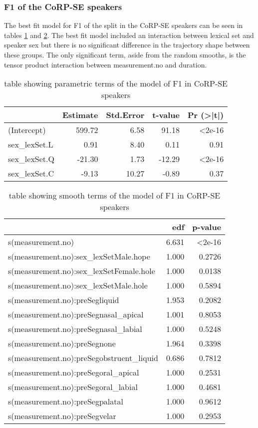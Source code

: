 \documentclass[../../../00.FullDoc/tex/Thesis]{subfiles}
\begin{document}
\subsubsection{F1 of the CoRP-SE speakers}
The best fit model for F1 of the \GG{} split in the CoRP-SE speakers can be seen in tables \ref{tbl:GGF1SE-para} and \ref{tbl:GGF1SE-smooth}. The best fit model included an interaction between lexical set and speaker sex but there is no significant difference in the trajectory shape between these groups. The only significant term, aside from the random smooths, is the tensor product interaction between measurement.no and duration.

\begin{table}[htbp]
	\centering
	\begin{tabular}{lrrrr}
		\hline
		& Estimate & Std.Error & t-value & Pr (>|t|) \\
		\hline
		(Intercept) & 599.72 & 6.58 & 91.18 & <2e-16 \\
		sex\_lexSet.L & 0.91 & 8.40 & 0.11 & 0.91 \\
		sex\_lexSet.Q & -21.30 & 1.73 & -12.29 & <2e-16 \\
		sex\_lexSet.C & -9.13 & 10.27 & -0.89 & 0.37 \\		
		\hline
	\end{tabular}%
	\caption{table showing parametric terms of the model of F1 in CoRP-SE speakers}
	\label{tbl:GGF1SE-para}%
\end{table}%

\begin{table}[htbp]
	\centering
	\begin{tabular}{lrr}
		\hline
		& edf & p-value \\
		\hline
		s(measurement.no) & 6.631 & <2e-16 \\
		s(measurement.no):sex\_lexSetMale.hope & 1.000 & 0.2726 \\
		s(measurement.no):sex\_lexSetFemale.hole & 1.000 & 0.0138 \\
		s(measurement.no):sex\_lexSetMale.hole & 1.000 & 0.5894 \\    
		s(measurement.no):preSegliquid & 1.953 & 0.2082 \\
		s(measurement.no):preSegnasal\_apical & 1.001 & 0.8053 \\
		s(measurement.no):preSegnasal\_labial & 1.000 & 0.5248 \\
		s(measurement.no):preSegnone & 1.964 & 0.3398 \\
		s(measurement.no):preSegobstruent\_liquid & 0.686 & 0.7812 \\
		s(measurement.no):preSegoral\_apical & 1.000 & 0.2531 \\
		s(measurement.no):preSegoral\_labial & 1.000 & 0.4681 \\ 
		s(measurement.no):preSegpalatal & 1.000 & 0.9612 \\
		s(measurement.no):preSegvelar & 1.000 & 0.2953 \\
		\hline
	\end{tabular}
	\caption{table showing smooth terms of the model of F1 in CoRP-SE speakers}
	\label{tbl:GGF1SE-smooth}
\end{table}
\end{document}
